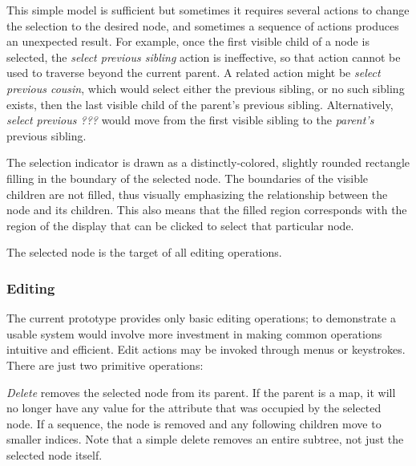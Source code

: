 

 This simple model is sufficient but sometimes it requires several actions to change the selection to the desired node, and sometimes a sequence of actions produces an unexpected result. For example, once the first visible child of a node is selected, the \emph{select previous sibling} action is ineffective, so that action cannot be used to traverse beyond the current parent. A related action might be \emph{select previous cousin}, which would select either the previous sibling, or no such sibling exists, then the last visible child of the parent's previous sibling. Alternatively, \emph{select previous ???} would move from the first visible sibling to the \emph{parent's} previous sibling.

The selection indicator is drawn as a distinctly-colored, slightly rounded rectangle filling in the boundary of the selected node. The boundaries of the visible children are not filled, thus visually emphasizing the relationship between the node and its children. This also means that the filled region corresponds with the region of the display that can be clicked to select that particular node. 


The selected node is the target of all editing operations.


\subsubsection{Editing}
The current prototype provides only basic editing operations; to demonstrate a usable system would involve more investment in making common operations intuitive and efficient. Edit actions may be invoked through menus or keystrokes. There are just two primitive operations:

\emph{Delete} removes the selected node from its parent. If the parent is a map, it will no longer have any value for the attribute that was occupied by the selected node. If a sequence, the node is removed and any following children move to smaller indices. Note that a simple delete removes an entire subtree, not just the selected node itself.

